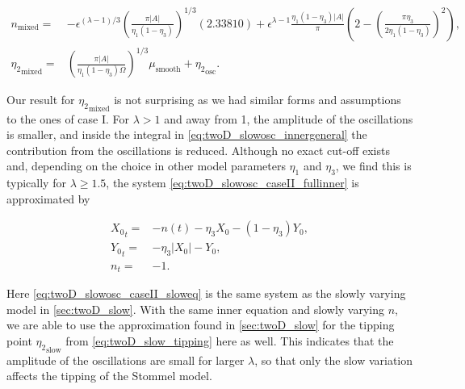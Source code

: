 \begin{equation}
\begin{aligned}
n_{\text{mixed}}=&-\epsilon^{(\lambda-1)/3}\left(\frac{\pi|A|}{\eta_1(1-\eta_3)}\right)^{1/3}(2.33810)+\epsilon^{\lambda-1}\frac{\eta_1(1-\eta_3)|A|}{\pi}\left(2-\left(\frac{\pi\eta_3}{2\eta_1(1-\eta_3)}\right)^2\right),\\
{\eta_2}_{\text{mixed}}=& \left(\frac{\pi|A|}{\eta_1(1-\eta_3)\Omega}\right)^{1/3}\mu_{\text{smooth}}+{\eta_2}_{\text{osc}}.
\end{aligned}
\end{equation}

\indent Our result for ${\eta_2}_{\text{mixed}}$ is not surprising as we had similar forms and assumptions to the ones of case I. For $\lambda>1$ and away from 1, the amplitude of the oscillations is smaller, and inside the integral in \eqref{eq:twoD_slowosc_innergeneral} the contribution from the oscillations is reduced. Although no exact cut-off exists and, depending on the choice in other model parameters $\eta_1$ and $\eta_3$, we find this is typically for $\lambda\ge 1.5$, the system \eqref{eq:twoD_slowosc_caseII_fullinner} is approximated by

\begin{equation}\label{eq:twoD_slowosc_caseII_sloweq}
\begin{aligned}
{X_0}_t =& -n(t)-\eta_3 X_0 -(1-\eta_3)Y_0,\\
{Y_0}_t =&-\eta_3|X_0|-Y_0,\\
n_t =&-1.
\end{aligned}
\end{equation}

Here \eqref{eq:twoD_slowosc_caseII_sloweq} is the same system as the slowly varying model in \autoref{sec:twoD_slow}. With the same inner equation and slowly varying $n$, we are able to use the approximation found in \autoref{sec:twoD_slow} for the tipping point ${\eta_2}_{\text{slow}}$ from \eqref{eq:twoD_slow_tipping} here as well. This indicates that the amplitude of the oscillations are small for larger $\lambda$, so that only the slow variation affects the tipping of the Stommel model.

